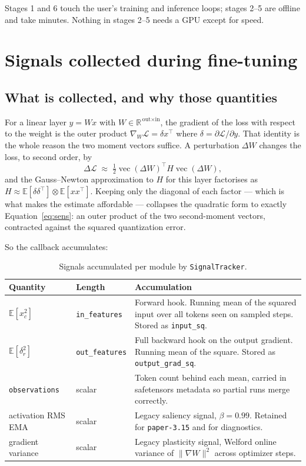 \documentclass[11pt]{article}
\newcommand{\code}[1]{\texttt{#1}}
\begin{document}
Stages 1 and 6 touch the user's training and inference loops; stages 2--5 are offline and take
minutes. Nothing in stages 2--5 needs a GPU except for speed.

\section{Signals collected during fine-tuning}
\label{sec:signals}

\subsection{What is collected, and why those quantities}

For a linear layer $y = Wx$ with $W \in \mathbb{R}^{\,\text{out}\times\text{in}}$, the gradient
of the loss with respect to the weight is the outer product $\nabla_W \mathcal{L} = \delta x^{\!\top}$
where $\delta = \partial\mathcal{L}/\partial y$. That identity is the whole reason the two moment
vectors suffice. A perturbation $\Delta W$ changes the loss, to second order, by
\begin{equation}
\Delta\mathcal{L} \;\approx\; \tfrac12 \operatorname{vec}(\Delta W)^{\!\top} H
\operatorname{vec}(\Delta W),
\end{equation}
and the Gauss--Newton approximation to $H$ for this layer factorises as
$H \approx \mathbb{E}[\delta\delta^{\!\top}] \otimes \mathbb{E}[xx^{\!\top}]$. Keeping only the
diagonal of each factor --- which is what makes the estimate affordable --- collapses the
quadratic form to exactly Equation~\ref{eq:sens}: an outer product of the two second-moment
vectors, contracted against the squared quantization error.

So the callback accumulates:

\begin{table}[H]
\centering\small
\caption{Signals accumulated per module by \code{SignalTracker}.}
\begin{tabular}{p{}p{}p{}}
\toprule
Quantity & Length & Accumulation \\
\midrule
$\mathbb{E}[x_c^2]$ & \code{in\_features} & Forward hook. Running mean of the squared input over
all tokens seen on sampled steps. Stored as \code{input\_sq}. \\
\rowcolor{rowtint}
$\mathbb{E}[\delta_r^2]$ & \code{out\_features} & Full backward hook on the output gradient.
Running mean of the square. Stored as \code{output\_grad\_sq}. \\
\code{observations} & scalar & Token count behind each mean, carried in safetensors metadata so
partial runs merge correctly. \\
\rowcolor{rowtint}
activation RMS EMA & scalar & Legacy saliency signal, $\beta = 0.99$. Retained for
\code{paper-3.15} and for diagnostics. \\
gradient variance & scalar & Legacy plasticity signal, Welford online variance of
$\lVert\nabla W\rVert^2$ across optimizer steps. \\
\bottomrule
\end{tabular}
\end{table}
\end{document}
